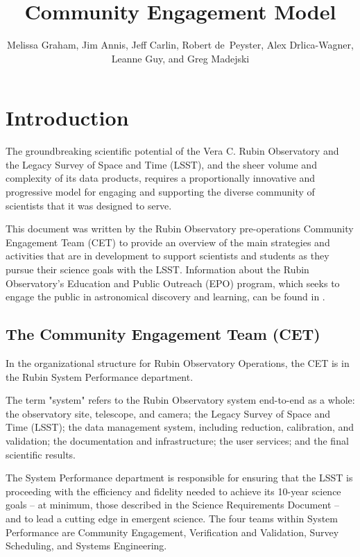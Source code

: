 \documentclass[DM,lsstdraft,toc]{lsstdoc}
\title{Community Engagement Model}
\author{%
Melissa Graham, Jim Annis, Jeff Carlin, Robert de~Peyster, Alex Drlica-Wagner, Leanne Guy, and Greg Madejski
}
\date{\vcsDate}
\begin{document}
\maketitle



\section{Introduction}\label{sec:intro}

The groundbreaking scientific potential of the Vera C. Rubin Observatory and the Legacy Survey of Space and Time (LSST), and the sheer volume and complexity of its data products, requires a proportionally innovative and progressive model for engaging and supporting the diverse community of scientists that it was designed to serve. 

This document was written by the Rubin Observatory pre-operations Community Engagement Team (CET) to provide an overview of the main strategies and activities that are in development to support scientists and students as they pursue their science goals with the LSST. 
Information about the Rubin Observatory's Education and Public Outreach (EPO) program, which seeks to engage the public in astronomical discovery and learning, can be found in .


\subsection{The Community Engagement Team (CET)}\label{sec:intro_org}

In the organizational structure for Rubin Observatory Operations, the CET is in the Rubin System Performance department.

The term "system" refers to the Rubin Observatory system end-to-end as a whole: the observatory site, telescope, and camera; the Legacy Survey of Space and Time (LSST); the data management system, including reduction, calibration, and validation; the documentation and infrastructure; the user services; and the final scientific results. 

The System Performance department is responsible for ensuring that the LSST is proceeding with the efficiency and fidelity needed to achieve its 10-year science goals -- at minimum, those described in the Science Requirements Document  -- and to lead a cutting edge in emergent science.
The four teams within System Performance are Community Engagement, Verification and Validation, Survey Scheduling, and Systems Engineering.
\end{document}
